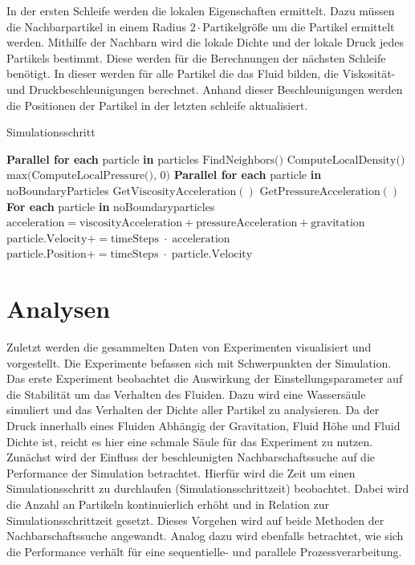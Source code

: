 \documentclass[a4paper, 12pt]{article}
\begin{document}
In der ersten Schleife werden die lokalen Eigenschaften ermittelt. Dazu müssen die Nachbarpartikel in einem Radius $2 \cdot \text{Partikelgröße}$ um die Partikel ermittelt werden. Mithilfe der Nachbarn wird die lokale Dichte und der lokale Druck jedes Partikels bestimmt. Diese werden für die Berechnungen der nächsten Schleife benötigt. In dieser werden für alle Partikel die das Fluid bilden, die Viskosität- und Druckbeschleunigungen berechnet. Anhand dieser Beschleunigungen werden die Positionen der Partikel in der letzten schleife aktualisiert. 

\begin{algorithm}[H]
	\caption{Simulationsschritt}
	\begin{algorithmic}[1]
	\State \textbf{Parallel for each} particle \textbf{in} particles
	\State \quad $\text{FindNeighbors()}$
	\State \quad $\text{ComputeLocalDensity()}$ \hfill {}
	\State \quad $\text{max(ComputeLocalPressure(), 0)}$ \hfill {}
	\vspace{1em}
	\State \textbf{Parallel for each} particle \textbf{in} noBoundaryParticles
	\State \quad $\text{GetViscosityAcceleration}()$ \hfill {}
	\State \quad $\text{GetPressureAcceleration}()$ \hfill {}
	\vspace{1em}
	\State \textbf{For each} particle \textbf{in} noBoundaryparticles
	\State \quad $\text{acceleration} = \text{viscosityAcceleration} + \text{pressureAcceleration} + \text{gravitation}$
	\State \quad $\text{particle.Velocity} += \text{timeSteps}\;\cdot\;\text{acceleration}$
	\State \quad $\text{particle.Position} += \text{timeSteps}\;\cdot\;\text{particle.Velocity}$
	\end{algorithmic}
	\end{algorithm}

\section{Analysen} \label{Kap:Alanysen}
Zuletzt werden die gesammelten Daten von Experimenten visualisiert und vorgestellt. Die Experimente befassen sich mit Schwerpunkten der Simulation. Das erste Experiment beobachtet die Auswirkung der Einstellungsparameter auf die Stabilität um das Verhalten des Fluiden. Dazu wird eine Wassersäule simuliert und das Verhalten der Dichte aller Partikel zu analysieren. Da der Druck innerhalb eines Fluiden Abhängig der Gravitation, Fluid Höhe und Fluid Dichte ist, reicht es hier eine schmale Säule für das Experiment zu nutzen. 
Zunächst wird der Einfluss der beschleunigten Nachbarschaftssuche auf die Performance der Simulation betrachtet. Hierfür wird die Zeit um einen Simulationsschritt zu durchlaufen (Simulationsschrittzeit) beobachtet. Dabei wird die Anzahl an Partikeln kontinuierlich erhöht und in Relation zur Simulationsschrittzeit gesetzt. Dieses Vorgehen wird auf beide Methoden der Nachbarschaftssuche angewandt.
Analog dazu wird ebenfalls betrachtet, wie sich die Performance verhält für eine sequentielle- und parallele Prozessverarbeitung.
\end{document}
